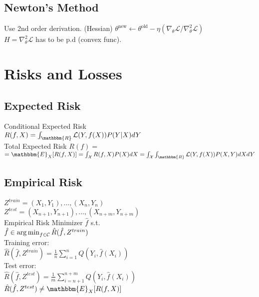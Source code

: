 \subsection*{Newton's Method}
Use 2nd order derivation. (Hessian)
$\theta^{\mathrm{new}}\leftarrow\theta^{\mathrm{old}}-\eta(\nabla_{\theta}\mathcal{L}/\nabla^2_{\theta}\mathcal{L})$\\
$H=\nabla^2_{\theta}\mathcal{L}$ has to be p.d (convex func).

\section*{Risks and Losses}
\subsection*{Expected Risk}
Conditional Expected Risk\\
$R(f, X) = \int_{\mathbbm{R}} \mathcal{L}(Y,f(X))P(Y|X)dY$\\
Total Expected Risk
$R(f) =$\\
$= \mathbbm{E}_{X}[R(f,X)] =\int_{\mathcal{X}}R(f,X)P(X)dX =
\int_{\mathcal{X}}\int_{\mathbbm{R}} \mathcal{L}(Y,f(X))P(X,Y)dXdY$


\subsection*{Empirical Risk}
$Z^{train}={(X_1,Y_1),...,(X_n,Y_n)}$ \\
$Z^{test}={(X_{n+1},Y_{n+1}),...,(X_{n+m},Y_{n+m})}$\\
Empirical Risk Minimizer $\hat{f}$ s.t.\\
$\hat{f} \in \operatorname*{arg\,min}_{f \in \mathcal{C}} \hat{R}(\hat{f}, Z^{train})$\\
Training error:\\
$\hat{R}(\hat{f}, Z^{train}) = \frac{1}{n} \sum_{i=1}^n Q(Y_i, \hat{f}(X_i))$\\
Test error:\\
$\hat{R}(\hat{f}, Z^{test}) = \frac{1}{m} \sum_{i=n+1}^{n+m} Q(Y_i, \hat{f}(X_i))$\\
$\hat{R}(\hat{f}, Z^{test}) \neq \mathbbm{E}_{X}[R(f,X)]$



